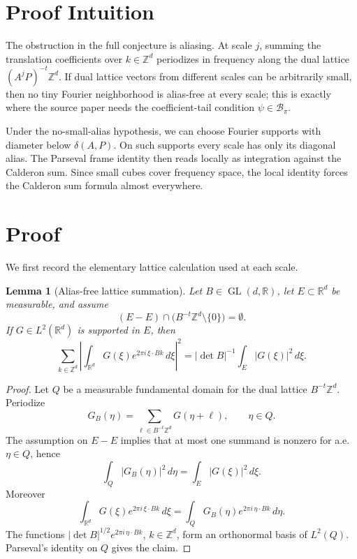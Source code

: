 \documentclass[11pt]{article}
\newtheorem{lemma}{Lemma}
\newcommand{\R}{\mathbb R}
\newcommand{\Z}{\mathbb Z}
\begin{document}
\section*{Proof Intuition}

The obstruction in the full conjecture is aliasing.  At scale $j$, summing the
translation coefficients over $k\in\Z^d$ periodizes in frequency along the dual
lattice $(A^jP)^{-t}\Z^d$.  If dual lattice vectors from different scales can
be arbitrarily small, then no tiny Fourier neighborhood is alias-free at every
scale; this is exactly where the source paper needs the coefficient-tail
condition $\psi\in\mathcal B_\pi$.

Under the no-small-alias hypothesis, we can choose Fourier supports with
diameter below $\delta(A,P)$.  On such supports every scale has only its
diagonal alias.  The Parseval frame identity then reads locally as integration
against the Calderon sum.  Since small cubes cover frequency space, the local
identity forces the Calderon sum formula almost everywhere.

\section*{Proof}

We first record the elementary lattice calculation used at each scale.

\begin{lemma}[Alias-free lattice summation]\label{lem:lattice}
Let $B\in\operatorname{GL}(d,\R)$, let $E\subset\R^d$ be measurable, and assume
\[
  (E-E)\cap \bigl(B^{-t}\Z^d\setminus\{0\}\bigr)=\emptyset.
\]
If $G\in L^2(\R^d)$ is supported in $E$, then
\[
  \sum_{k\in\Z^d}
  \left|\int_{\R^d} G(\xi)e^{2\pi i\,\xi\cdot Bk}\,d\xi\right|^2
  =
  |\det B|^{-1}\int_E |G(\xi)|^2\,d\xi .
\]
\end{lemma}

\begin{proof}
Let $Q$ be a measurable fundamental domain for the dual lattice
$B^{-t}\Z^d$.  Periodize
\[
  G_B(\eta)=\sum_{\ell\in B^{-t}\Z^d}G(\eta+\ell),
  \qquad \eta\in Q.
\]
The assumption on $E-E$ implies that at most one summand is nonzero for a.e.
$\eta\in Q$, hence
\[
  \int_Q |G_B(\eta)|^2\,d\eta=\int_E |G(\xi)|^2\,d\xi.
\]
Moreover
\[
  \int_{\R^d}G(\xi)e^{2\pi i\,\xi\cdot Bk}\,d\xi
  =
  \int_Q G_B(\eta)e^{2\pi i\,\eta\cdot Bk}\,d\eta .
\]
The functions $|\det B|^{1/2}e^{2\pi i\,\eta\cdot Bk}$, $k\in\Z^d$, form an
orthonormal basis of $L^2(Q)$.  Parseval's identity on $Q$ gives the claim.
\end{proof}
\end{document}
